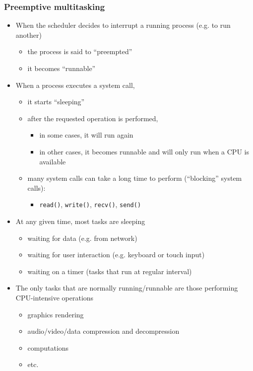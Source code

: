 \documentclass[12pt]{article}
\begin{document}
\subsubsection{Preemptive multitasking}
\begin{itemize}
  \item When the scheduler decides to interrupt a running process (e.g. to run another)
  \begin{itemize}
    \item the process is said to ``preempted''
    \item it becomes ``runnable''
  \end{itemize}
  \item When a process executes a system call,
  \begin{itemize}
    \item it starts ``sleeping''
    \item after the requested operation is performed,
    \begin{itemize}
      \item in some cases, it will run again
      \item in other cases, it becomes runnable and will only run when a CPU is available
    \end{itemize}
    \item many system calls can take a long time to perform (``blocking'' system calls):
    \begin{itemize}
      \item \texttt{read()}, \texttt{write()}, \texttt{recv()}, \texttt{send()}
    \end{itemize}
  \end{itemize}
\end{itemize}

\begin{itemize}
  \item At any given time, most tasks are sleeping
  \begin{itemize}
    \item waiting for data (e.g. from network)
    \item waiting for user interaction (e.g. keyboard or touch input)
    \item waiting on a timer (tasks that run at regular interval)
  \end{itemize}
  \item The only tasks that are normally running/runnable are those performing CPU-intensive operations
  \begin{itemize}
    \item graphics rendering
    \item audio/video/data compression and decompression
    \item computations
    \item etc.
  \end{itemize}
\end{itemize}
\end{document}

